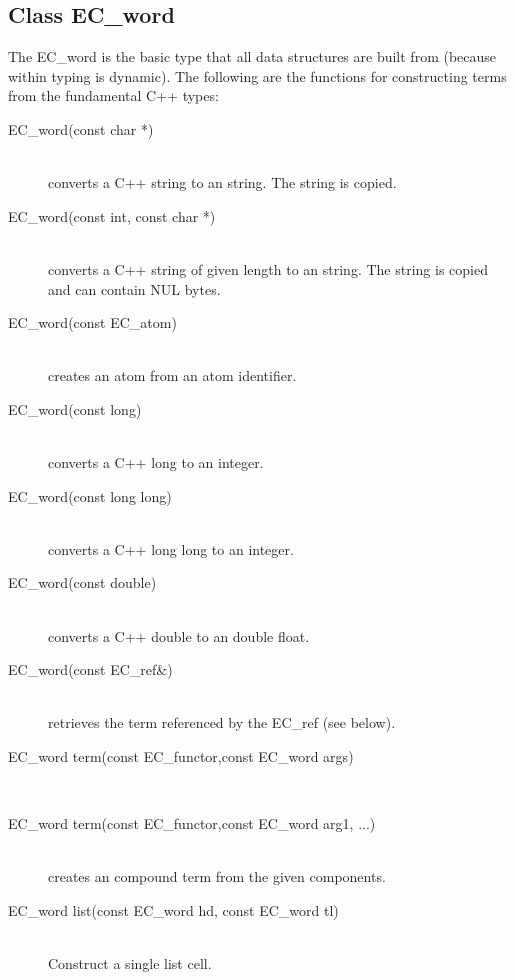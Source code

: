 \subsection{Class EC_word}
The EC_word is the basic type that all {\eclipse} data structures are
built from (because within {\eclipse} typing is dynamic).
The following are the functions for constructing {\eclipse} terms from
the fundamental C++ types:
\begin{description}
\item[EC_word(const char *)]\ \\
	converts a C++ string to an {\eclipse} string. The string is copied.

\item[EC_word(const int, const char *)]\ \\
	converts a C++ string of given length to an {\eclipse} string.
	The string is copied and can contain NUL bytes.

\item[EC_word(const EC_atom)]\ \\
	creates an {\eclipse} atom from an atom identifier.

\item[EC_word(const long)]\ \\
	converts a C++ long to an {\eclipse} integer.

\item[EC_word(const long long)]\ \\
	converts a C++ long long to an {\eclipse} integer.

\item[EC_word(const double)]\ \\
	converts a C++ double to an {\eclipse} double float.

\item[EC_word(const EC_ref\&)]\ \\
	retrieves the {\eclipse} term referenced by the EC_ref (see below).

\item[EC_word term(const EC_functor,const EC_word args\nil)]\ \\
\item[EC_word term(const EC_functor,const EC_word arg1, ...)]\ \\
	creates an {\eclipse} compound term from the given components.

\item[EC_word list(const EC_word hd, const EC_word tl)]\ \\
	Construct a single {\eclipse} list cell.


\end{description}
